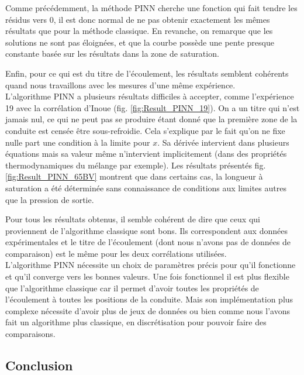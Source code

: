 Comme précédemment, la méthode PINN cherche une fonction qui fait tendre les résidus vers 0, il est donc normal de ne pas obtenir exactement les mêmes résultats que pour la méthode classique. En revanche, on remarque que les solutions ne sont pas éloignées, et que la courbe possède une pente presque constante basée sur les résultats dans la zone de saturation.\\ \par
Enfin, pour ce qui est du titre de l'écoulement, les résultats semblent cohérents quand nous travaillons avec les mesures d'une même expérience. \\

L'algorithme PINN a plusieurs résultats difficiles à accepter, comme l'expérience 19 avec la corrélation d'Inoue (fig. \ref{fig:Result_PINN_19}). On a un titre qui n'est jamais nul, ce qui ne peut pas se produire étant donné que la première zone de la conduite est censée être sous-refroidie. Cela s'explique par le fait qu'on ne fixe nulle part  une condition à la limite pour $x$. Sa dérivée intervient dans plusieurs équations mais sa valeur même n'intervient implicitement (dans des propriétés thermodynamiques du mélange par exemple). Les résultats présentés fig. \ref{fig:Result_PINN_65BV} montrent que dans certains cas, la longueur à saturation a été déterminée sans connaissance de conditions aux limites autres que la pression de sortie.\\ \par

Pour tous les résultats obtenus, il semble cohérent de dire que ceux qui proviennent de l'algorithme classique sont bons. Ils correspondent aux données expérimentales et le titre de l'écoulement (dont nous n'avons pas de données de comparaison) est le même pour les deux corrélations utilisées.\\

L'algorithme PINN nécessite un choix de paramètres précis pour qu'il fonctionne et qu'il converge vers les bonnes valeurs. Une fois fonctionnel il est plus flexible que l'algorithme classique car il permet d'avoir toutes les propriétés de l'écoulement à toutes les positions de la conduite. Mais son implémentation plus complexe nécessite d'avoir plus de jeux de données ou bien comme nous l'avons fait un algorithme plus classique, en discrétisation pour pouvoir faire des comparaisons.

\subsection{Conclusion}

